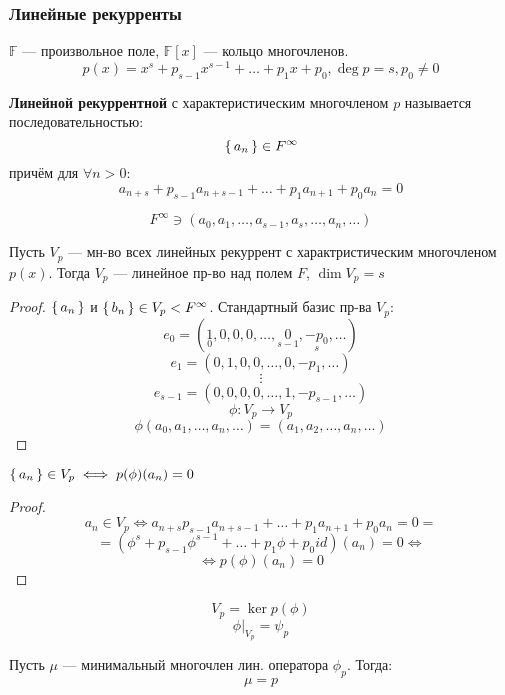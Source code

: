 \subsubsection{Линейные рекурренты}
$\mathbb{F}$ --- произвольное поле, $\mathbb{F}[x]$ --- кольцо многочленов.
\[
p(x) = x^{s} + p_{s - 1} x^{s - 1} + \ldots + p_1 x + p_0, \deg p = s, p_0 \neq 0
\]
\begin{definition}
\textbf{Линейной рекуррентной} с характеристическим многочленом $p$ называется последовательностью:
\[
    \set{a_n} \in F^{\infty}
\]
причём для $\forall n > 0$:
\begin{equation}
    \label{eq:07_linear_reccurence}
    a_{n + s} + p_{s - 1}a_{n + s - 1} + \ldots + p_1 a_{n + 1} + p_0 a_n = 0
\end{equation}
\end{definition}
\[
    F^{\infty} \ni (a_0, a_1, \ldots, a_{s - 1}, a_s, \ldots, a_n, \ldots)
\]
\begin{statement}
    \label{statement:07_1}
    Пусть $V_p$ --- мн-во всех линейных рекуррент с характристическим многочленом $p(x)$. Тогда $V_p$ --- линейное пр-во над полем $F$, $\dim V_p = s$
\end{statement}
\begin{proof}
    $\set{a_n}$ и $\set{b_n} \in V_p < F^{\infty}$. Стандартный базис пр-ва $V_p$:
    \[
    e_0 = (\underset{0}{1}, 0, 0, 0, \ldots, \underset{s - 1}{0}, \underset{s}{-p_0}, \ldots)
    \]
    \[
    e_1 = (0, 1, 0, 0, \ldots, 0, -p_1, \ldots)
    \]
    \[
    \vdots
    \]
    \[
    e_{s - 1} = (0, 0, 0, 0, \ldots, 1, -p_{s - 1}, \ldots)
    \]
    \[
    \phi \colon V_p \rightarrow V_p
    \]
    \[
    \phi(a_0, a_1, \ldots, a_n, \ldots) = (a_1, a_2, \ldots, a_n, \ldots)
    \]
\end{proof}
\begin{statement}
    \label{statement:07_2}
    $\set{a_n} \in V_p \iff p(\phi)(a_n) = 0$
\end{statement}
\begin{proof}
    \[
        a_n \in V_p \iff a_{n + s} p_{s - 1} a_{n + s - 1} + \ldots + p_1 a_{n + 1} + p_0 a_n = 0 =
    \]
    \[
    = (\phi^{s} + p_{s - 1}\phi^{s - 1} + \ldots + p_1 \phi + p_0 id)(a_n) = 0 \iff
    \]
    \[
    \iff p(\phi)(a_n) = 0
    \]
\end{proof}
\begin{consequence}
    \[
    V_p = \ker p(\phi)
    \]
    \[
    \phi|_{V_p} = \psi_p
    \]
\end{consequence}
\begin{statement}
    \label{statement:07_3}
    Пусть $\mu$ --- минимальный многочлен лин. оператора $\phi_p$. Тогда:
    \[
        \mu = p
    \]
\end{statement}

